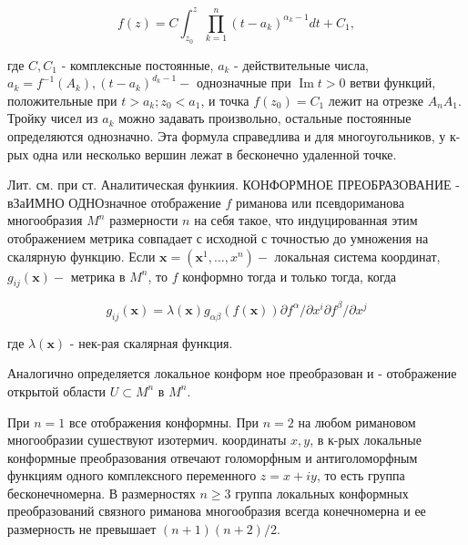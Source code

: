 \documentclass[10pt]{article}
\begin{document}
\[

f(z)=C \int_{z_{0}}^{z} \prod_{k=1}^{n}\left(t-a_{k}\right)^{\alpha_{k}-1} d t+C_{1},

\]



где $C, C_{1}$ - комплексные постоянные, $a_{k}$ - действительные числа, $a_{k}=f^{-1}\left(A_{k}\right),\left(t-a_{k}\right)^{d_{k}-1}-$ однозначные при $\operatorname{Im} t>0$ ветви функций, положительные при $t>a_{k} ; z_{0}<a_{1}$, и точка $f\left(z_{0}\right)=C_{1}$ лежит на отрезке $A_{n} A_{1}$. Тройку чисел из $a_{k}$ можно задавать произвольно, остальные постоянные определяются однозначно. Эта формула справедлива и для многоугольников, у к-рых одна или несколько вершин лежат в бесконечно удаленной точке.



Лит. см. при ст. Аналитическая функиия. КОНФОРМНОЕ ПРЕОБРАЗОВАНИЕ - вЗаИМНО ОДНОзначное отображение $f$ риманова или псевдориманова многообразия $M^{n}$ размерности $n$ на себя такое, что индуцированная этим отображением метрика совпадает с исходной с точностью до умножения на скалярную функцию. Если $\boldsymbol{x}=\left(\boldsymbol{x}^{1}, \ldots, x^{n}\right)-$ локальная система координат, $g_{i j}(\boldsymbol{x})-$ метрика в $M^{n}$, то $f$ конформно тогда и только тогда, когда



\[

g_{i j}(\boldsymbol{x})=\lambda(\boldsymbol{x}) g_{\alpha \beta}(f(\boldsymbol{x})) \partial f^{\alpha} / \partial x^{i} \partial f^{\beta} / \partial x^{j}

\]



где $\lambda(\boldsymbol{x})$ - нек-рая скалярная функция.



Аналогично определяется локальное конформ ное преобразован и - отображение открытой области $U \subset M^{n}$ в $M^{n}$.



При $n=1$ все отображения конформны. При $n=2$ на любом римановом многообразии сушествуют изотермич. координаты $x, y$, в к-рых локальные конформные преобразования отвечают голоморфным и антиголоморфным функциям одного комплексного переменного $z=x+i y$, то есть группа бесконечномерна. В размерностях $n \geqslant 3$ группа локальных конформных преобразований связного риманова многообразия всегда конечномерна и ее размерность не превышает $(n+1)(n+2) / 2$.
\end{document}
